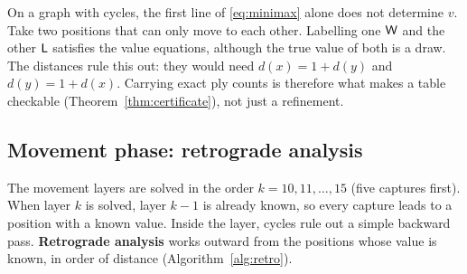 \begin{remark}\label{rem:cycles}
On a graph with cycles, the first line of \eqref{eq:minimax} alone does not determine $v$. Take two positions
that can only move to each other. Labelling one $\mathsf{W}$ and the other $\mathsf{L}$ satisfies the value equations,
although the true value of both is a draw. The distances rule this out: they would need $d(x) = 1 + d(y)$ and
$d(y) = 1 + d(x)$. Carrying exact ply counts is therefore what makes a table checkable
(Theorem~\ref{thm:certificate}), not just a refinement.
\end{remark}

\subsection{Movement phase: retrograde analysis}\label{sec:dp-movement}

The movement layers are solved in the order $k = 10, 11, \dots, 15$ (five captures first). When layer $k$ is
solved, layer $k - 1$ is already known, so every capture leads to a position with a known value. Inside the
layer, cycles rule out a simple backward pass. \textbf{Retrograde analysis} works outward from the positions
whose value is known, in order of distance (Algorithm~\ref{alg:retro}).

